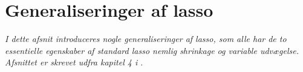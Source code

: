 \section{Generaliseringer af lasso}
\textit{I dette afsnit introduceres nogle generaliseringer af lasso, som alle har de to essentielle egenskaber af standard lasso nemlig shrinkage og variable udvægelse.
Afsnittet er skrevet udfra kapitel 4 i \citep{hastie}}.





